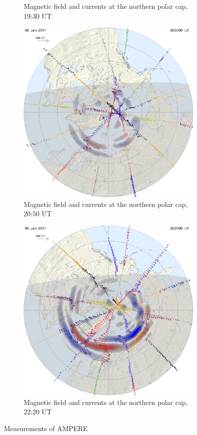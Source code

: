 \documentclass[10pt,a4paper]{article}
\begin{document}
\begin{figure}[h]
\begin{subfigure}[h]{.5\textwidth}
		\caption{Magnetic field and currents at the northern polar cap, 19:30 UT}
		\label{amp2}
	\end{subfigure}
	\begin{subfigure}[h]{.5\textwidth}
		\centering
		\includegraphics[width=.8\linewidth]{1294347000north.png}
		\caption{Magnetic field and currents at the northern polar cap, 20:50 UT}
		\label{amp3}
	\end{subfigure}
	\begin{subfigure}[h]{.5\textwidth}
		\centering
		\includegraphics[width=.8\linewidth]{1294352400north.png}
		\caption{Magnetic field and currents at the northern polar cap, 22:20 UT}
		\label{amp4}
	\end{subfigure}
	\caption{Measurements of AMPERE}
	\label{amp}
\end{figure}
\end{document}
